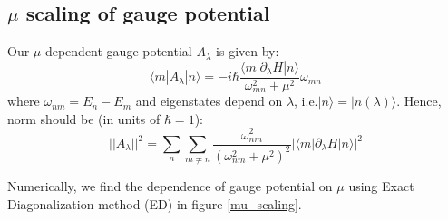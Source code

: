 \documentclass[11pt,a4paper]{article}
\begin{document}
%
%
%
%
%







\subsection{$\mu$ scaling of gauge potential}




Our $\mu$-dependent gauge potential $A_{\lambda}$ is given by:
\begin{equation}
\langle m |A_{\lambda} | n \rangle =  -i \hbar \dfrac{\langle m |\partial_{\lambda}H | n \rangle}{\omega_{mn}^2+ \mu^2} \omega_{mn}
\end{equation}
where $\omega_{nm}=E_n-E_m$ and eigenstates depend on $\lambda$, i.e.$|n \rangle= |n (\lambda) \rangle $. Hence, norm should be (in units of $\hbar=1$):
\begin{equation}
||A_{\lambda}||^2 = \sum_n \sum_{m \neq n}  \dfrac{\omega_{nm}^2}{(\omega_{nm}^2 + \mu^2)^2} |\langle m | \partial_{\lambda}H| n \rangle|^2
\end{equation}

Numerically, we find the dependence of gauge potential on $\mu$ using Exact Diagonalization method (ED) in figure \ref{mu_scaling}.
\end{document}
